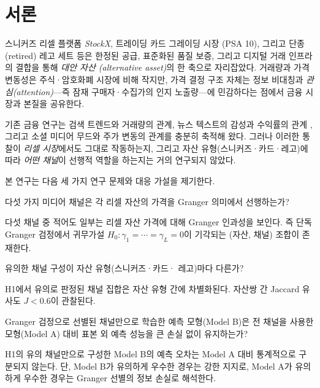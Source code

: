 \documentclass[11pt, a4paper, twocolumn]{article}
\begin{document}
\section{서론}\label{sec:intro}

스니커즈 리셀 플랫폼 \textit{StockX}, 트레이딩 카드 그레이딩 시장
(PSA 10), 그리고 단종(retired) 레고 세트 등은 한정된 공급, 표준화된
품질 보증, 그리고 디지털 거래 인프라의 결합을 통해 \emph{대안 자산
(alternative asset)}의 한 축으로 자리잡았다. 거래량과 가격 변동성은
주식·암호화폐 시장에 비해 작지만, 가격 결정 구조 자체는 정보 비대칭과
\emph{관심(attention)}---즉 잠재 구매자·수집가의 인지 노출량---에
민감하다는 점에서 금융 시장과 본질을 공유한다.

기존 금융 연구는 검색 트렌드와 거래량의 관계\citep{daengelberggao2011,
preismoatstanley2013}, 뉴스 텍스트의 감성과 수익률의 관계
\citep{tetlock2007, loughranmcdonald2011}, 그리고 소셜 미디어 무드와
주가 변동의 관계\citep{bollenmaozeng2011}를 충분히 축적해 왔다.
그러나 이러한 통찰이 \emph{리셀 시장}에서도 그대로 작동하는지, 그리고
자산 유형(스니커즈·카드·레고)에 따라 \emph{어떤 채널}이 선행적
역할을 하는지는 거의 연구되지 않았다.

본 연구는 다음 세 가지 연구 문제와 대응 가설을 제기한다.

\begin{description}[leftmargin=1.6em, labelindent=0.4em]
  \item[\textbf{RQ1}] 다섯 가지 미디어 채널은 각 리셀 자산의 가격을
        Granger 의미에서 선행하는가?
  \item[\textbf{H1}] 다섯 채널 중 적어도 일부는 리셀 자산 가격에 대해
        Granger 인과성을 보인다. 즉 단독 Granger 검정에서 귀무가설
        $H_0\colon\gamma_1=\cdots=\gamma_L=0$이 기각되는 (자산, 채널)
        조합이 존재한다.
  \item[\textbf{RQ2}] 유의한 채널 구성이 자산 유형(스니커즈·카드·
        레고)마다 다른가?
  \item[\textbf{H2}] H1에서 유의로 판정된 채널 집합은 자산 유형 간에
        차별화된다. 자산쌍 간 Jaccard 유사도 $J<0.6$이 관찰된다.
  \item[\textbf{RQ3}] Granger 검정으로 선별된 채널만으로 학습한 예측
        모형(Model B)은 전 채널을 사용한 모형(Model A) 대비 표본 외
        예측 성능을 큰 손실 없이 유지하는가?
  \item[\textbf{H3}] H1의 유의 채널만으로 구성한 Model B의 예측 오차는
        Model A 대비 통계적으로 구분되지 않는다. 단, Model B가
        유의하게 우수한 경우는 강한 지지로, Model A가 유의하게 우수한
        경우는 Granger 선별의 정보 손실로 해석한다.
\end{description}
\end{document}

